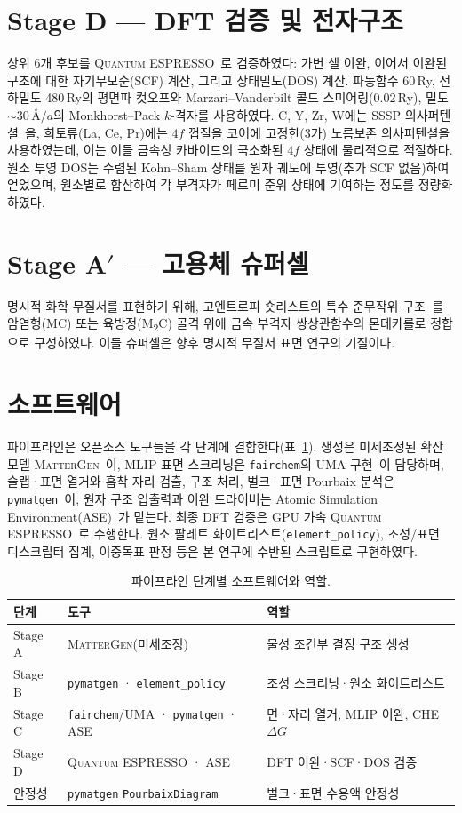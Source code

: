 \documentclass[11pt,a4paper]{report}
\providecommand{\SI}[2]{#1\,#2}
\providecommand{\angstrom}{\mbox{\AA}}
\begin{document}
\section{Stage D --- DFT 검증 및 전자구조}
상위 6개 후보를 \textsc{Quantum ESPRESSO}~\cite{giannozzi2009}로 검증하였다: 가변 셀 이완, 이어서
이완된 구조에 대한 자기무모순(SCF) 계산, 그리고 상태밀도(DOS) 계산. 파동함수 \SI{60}{Ry}, 전하밀도
\SI{480}{Ry}의 평면파 컷오프와 Marzari--Vanderbilt 콜드 스미어링(\SI{0.02}{Ry}), 밀도
$\sim\!\SI{30}{\angstrom}/a$의 Monkhorst--Pack $k$-격자를 사용하였다. C, Y, Zr, W에는 SSSP
의사퍼텐셜~\cite{prandini2018}을, 희토류(La, Ce, Pr)에는 $4f$ 껍질을 코어에 고정한(3가) 노름보존
의사퍼텐셜을 사용하였는데, 이는 이들 금속성 카바이드의 국소화된 $4f$ 상태에 물리적으로 적절하다.
원소 투영 DOS는 수렴된 Kohn--Sham 상태를 원자 궤도에 투영(추가 SCF 없음)하여 얻었으며, 원소별로
합산하여 각 부격자가 페르미 준위 상태에 기여하는 정도를 정량화하였다.

\section{Stage A$'$ --- 고용체 슈퍼셀}
명시적 화학 무질서를 표현하기 위해, 고엔트로피 숏리스트의 특수 준무작위 구조~\cite{zunger1990}를
암염형(MC) 또는 육방정(M\textsubscript{2}C) 골격 위에 금속 부격자 쌍상관함수의 몬테카를로 정합으로
구성하였다. 이들 슈퍼셀은 향후 명시적 무질서 표면 연구의 기질이다.

\section{소프트웨어}
파이프라인은 오픈소스 도구들을 각 단계에 결합한다(표~\ref{tab:software}). 생성은 미세조정된
확산 모델 \textsc{MatterGen}~\cite{zeni2025}이, MLIP 표면 스크리닝은 \texttt{fairchem}의 UMA
구현~\cite{uma2025}이 담당하며, 슬랩·표면 열거와 흡착 자리 검출, 구조 처리, 벌크·표면 Pourbaix
분석은 \texttt{pymatgen}~\cite{pymatgen2013}이, 원자 구조 입출력과 이완 드라이버는 Atomic Simulation
Environment(ASE)~\cite{ase2017}가 맡는다. 최종 DFT 검증은 GPU 가속 \textsc{Quantum
ESPRESSO}~\cite{giannozzi2009}로 수행한다. 원소 팔레트 화이트리스트(\texttt{element\_policy}),
조성/표면 디스크립터 집계, 이중목표 판정 등은 본 연구에 수반된 스크립트로 구현하였다.

\begin{table}[t]
\centering
\caption{파이프라인 단계별 소프트웨어와 역할.}
\label{tab:software}
\small
\begin{tabular}{lll}
\hline
단계 & 도구 & 역할 \\
\hline
Stage A & \textsc{MatterGen}(미세조정) & 물성 조건부 결정 구조 생성 \\
Stage B & \texttt{pymatgen} · \texttt{element\_policy} & 조성 스크리닝·원소 화이트리스트 \\
Stage C & \texttt{fairchem}/UMA · \texttt{pymatgen} · ASE & 면·자리 열거, MLIP 이완, CHE $\Delta G$ \\
Stage D & \textsc{Quantum ESPRESSO} · ASE & DFT 이완·SCF·DOS 검증 \\
안정성 & \texttt{pymatgen} \texttt{PourbaixDiagram} & 벌크·표면 수용액 안정성 \\
\hline
\end{tabular}
\end{table}
\end{document}
